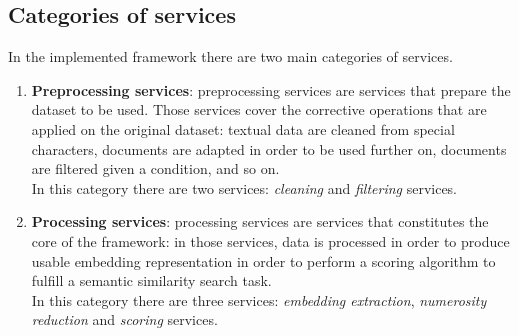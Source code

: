\documentclass[\main/main.tex]{subfiles}
\begin{document}
\subsection{Categories of services}
In the implemented framework there are two main categories of services.
\begin{enumerate}
    \item \textbf{Preprocessing services}: preprocessing services are services that prepare the dataset to be used. Those services cover the corrective operations that are applied on the original dataset: textual data are cleaned from special characters, documents are adapted in order to be used further on, documents are filtered given a condition, and so on.  \\
    In this category there are two services: \emph{cleaning} and \emph{filtering} services.
    \item \textbf{Processing services}: processing services are services that constitutes the core of the framework: in those services, data is processed in order to produce usable embedding representation in order to perform a scoring algorithm to fulfill a semantic similarity search task. \\
    In this category there are three services: \emph{embedding extraction}, \emph{numerosity reduction} and \emph{scoring} services.
\end{enumerate}
\end{document}
